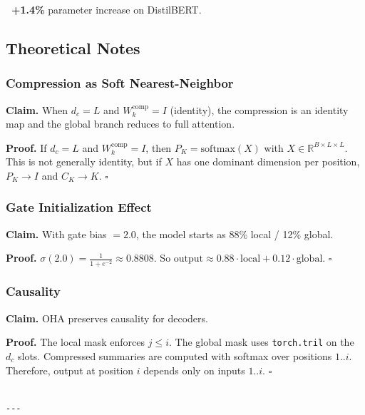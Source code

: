 \textbf{~+1.4\%} parameter increase on DistilBERT.

\subsection{Theoretical Notes}

\subsubsection{Compression as Soft Nearest-Neighbor}

\textbf{Claim.} When $d_c = L$ and $W_k^\text{comp} = I$ (identity), the 
compression is an identity map and the global branch reduces to full 
attention.

\textbf{Proof.} If $d_c = L$ and $W_k^\text{comp} = I$, then $P_K = \text{softmax}(X)$ 
with $X \in \mathbb{R}^{B \times L \times L}$. This is not generally identity, 
but if $X$ has one dominant dimension per position, $P_K \to I$ and $C_K \to K$. $\square$

\subsubsection{Gate Initialization Effect}

\textbf{Claim.} With gate bias $= 2.0$, the model starts as 88\% local / 12\% global.

\textbf{Proof.} $\sigma(2.0) = \frac{1}{1 + e^{-2}} \approx 0.8808$. So 
$\text{output} \approx 0.88 \cdot \text{local} + 0.12 \cdot \text{global}$. $\square$

\subsubsection{Causality}

\textbf{Claim.} OHA preserves causality for decoders.

\textbf{Proof.} The local mask enforces $j \leq i$. The global mask uses 
\texttt{torch.tril} on the $d_c$ slots. Compressed summaries are computed with 
softmax over positions $1..i$. Therefore, output at position $i$ depends 
only on inputs $1..i$. $\square$
\begin{lstlisting}

---
\end{lstlisting}